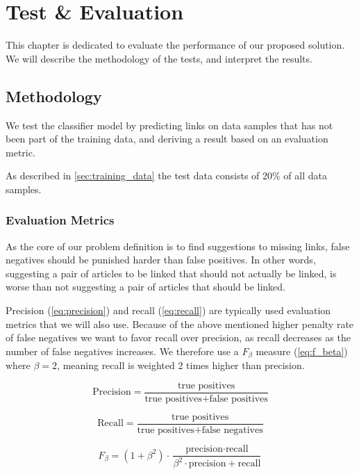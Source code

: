 \chapter{Test \& Evaluation}\label{chap:testeval}
This chapter is dedicated to evaluate the performance of our proposed solution. We will describe the methodology of the tests, and interpret the results.

\section{Methodology}
We test the classifier model by predicting links on data samples that has not been part of the training data, and deriving a result based on an evaluation metric.

As described in \cref{sec:training_data} the test data consists of 20\% of all data samples.

\subsection{Evaluation Metrics}
As the core of our problem definition is to find suggestions to missing links, false negatives should be punished harder than false positives. In other words, suggesting a pair of articles to be linked that should not actually be linked, is worse than not suggesting a pair of articles that should be linked. 

Precision (\cref{eq:precision}) and recall (\cref{eq:recall}) are typically used evaluation metrics that we will also use. Because of the above mentioned higher penalty rate of false negatives we want to favor recall over precision, as recall decreases as the number of false negatives increases. We therefore use a $F_\beta$ measure (\cref{eq:f_beta}) where $\beta = 2$, meaning recall is weighted 2 times higher than precision. 

\begin{equation}\label{eq:precision}
\text{Precision} = \frac{\text{true positives}}{\text{true positives} + \text{false positives}}
\end{equation}

\begin{equation}\label{eq:recall}
\text{Recall} = \frac{\text{true positives}}{\text{true positives} + \text{false negatives}}
\end{equation}

\begin{equation}\label{eq:f_beta}
F_\beta = (1+ \beta^2 ) \cdot \frac{ \text{precision} \cdot \text{recall} }{ \beta^2 \cdot \text{precision} + \text{recall} }
\end{equation}


